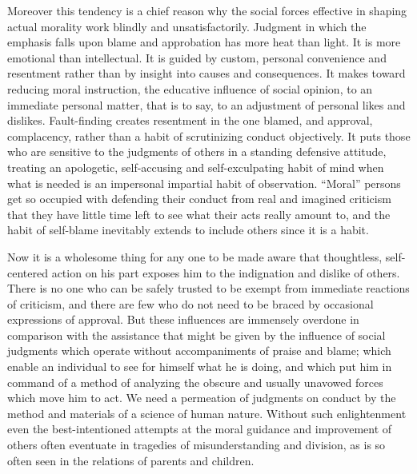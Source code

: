 Moreover this tendency is a chief reason why the social forces
effective in shaping actual morality work blindly and
unsatisfactorily. Judgment in which the emphasis falls upon blame and
approbation has more heat than light. It is more emotional than
intellectual. It is guided by custom, personal convenience and
resentment rather than by insight into causes and consequences. It
makes toward reducing moral instruction, the educative influence of
social opinion, to an immediate personal matter, that is to say, to an
adjustment of personal likes and dislikes. Fault-finding creates
resentment in the one blamed, and approval, complacency, rather than a
habit of scrutinizing conduct objectively. It puts those who are
sensitive to the judgments of others in a standing defensive attitude,
treating an apologetic, self-accusing and self-exculpating habit of
mind when what is needed is an impersonal  impartial habit
of observation. ``Moral'' persons get so occupied with defending their
conduct from real and imagined criticism that they have little time
left to see what their acts really amount to, and the habit of
self-blame inevitably extends to include others since it is a habit.

Now it is a wholesome thing for any one to be made aware that
thoughtless, self-centered action on his part exposes him to the
indignation and dislike of others. There is no one who can be safely
trusted to be exempt from immediate reactions of criticism, and there
are few who do not need to be braced by occasional expressions of
approval. But these influences are immensely overdone in comparison
with the assistance that might be given by the influence of social
judgments which operate without accompaniments of praise and blame;
which enable an individual to see for himself what he is doing, and
which put him in command of a method of analyzing the obscure and
usually unavowed forces which move him to act. We need a permeation of
judgments on conduct by the method and materials of a science of human
nature. Without such enlightenment even the best-intentioned attempts
at the moral guidance and improvement of others often eventuate in
tragedies of misunderstanding and division, as is so often seen in the
relations of parents and children.

